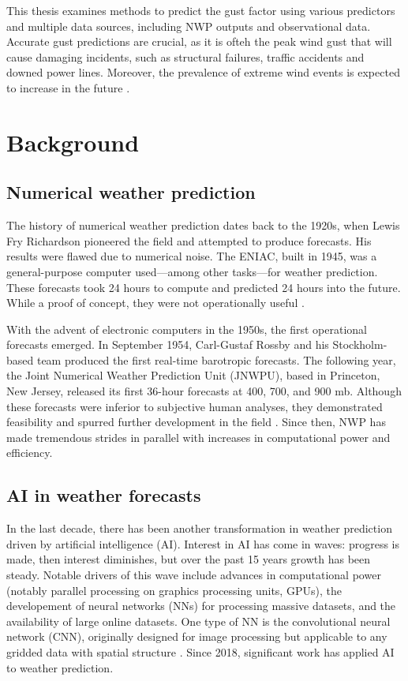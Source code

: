 This thesis examines methods to predict the gust factor using various predictors and multiple data sources, including NWP outputs and observational data. Accurate gust predictions are crucial, as it is ofteh the peak wind gust that will cause damaging incidents, such as structural failures, traffic accidents and downed power lines. Moreover, the prevalence of extreme wind events is expected to increase in the future \cite{nasa_extreme_weather}.

\section{Background}

\subsection*{Numerical weather prediction}
The history of numerical weather prediction dates back to the 1920s, when Lewis Fry Richardson pioneered the field and attempted to produce forecasts. His results were flawed due to numerical noise. The ENIAC, built in 1945, was a general-purpose computer used—among other tasks—for weather prediction. These forecasts took 24 hours to compute and predicted 24 hours into the future. While a proof of concept, they were not operationally useful \cite{TheENIACForecastsARecreation}. 

With the advent of electronic computers in the 1950s, the first operational forecasts emerged. In September 1954, Carl-Gustaf Rossby and his Stockholm-based team produced the first real-time barotropic forecasts. The following year, the Joint Numerical Weather Prediction Unit (JNWPU), based in Princeton, New Jersey, released its first 36-hour forecasts at 400, 700, and 900 mb. Although these forecasts were inferior to subjective human analyses, they demonstrated feasibility and spurred further development in the field \cite{historyNWP}. Since then, NWP has made tremendous strides in parallel with increases in computational power and efficiency.

\subsection*{AI in weather forecasts}
In the last decade, there has been another transformation in weather prediction driven by artificial intelligence (AI). Interest in AI has come in waves: progress is made, then interest diminishes, but over the past 15 years growth has been steady. Notable drivers of this wave include advances in computational power (notably parallel processing on graphics processing units, GPUs), the developement of neural networks (NNs) for processing massive datasets, and the availability of large online datasets. One type of NN is the convolutional neural network (CNN), originally designed for image processing but applicable to any gridded data with spatial structure \cite{canNNBeatNWP}. Since 2018, significant work has applied AI to weather prediction.

